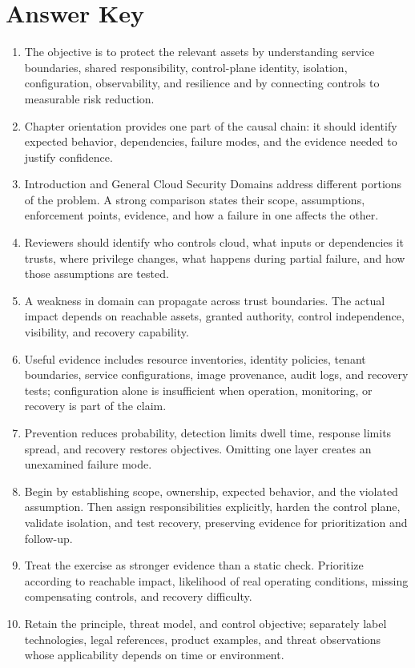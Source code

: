 \documentclass[11pt,letterpaper]{article}
\begin{document}
\section*{Answer Key}
\begin{enumerate}
\item The objective is to protect the relevant assets by understanding service boundaries, shared responsibility, control-plane identity, isolation, configuration, observability, and resilience and by connecting controls to measurable risk reduction.
\item Chapter orientation provides one part of the causal chain: it should identify expected behavior, dependencies, failure modes, and the evidence needed to justify confidence.
\item Introduction and General Cloud Security Domains address different portions of the problem. A strong comparison states their scope, assumptions, enforcement points, evidence, and how a failure in one affects the other.
\item Reviewers should identify who controls cloud, what inputs or dependencies it trusts, where privilege changes, what happens during partial failure, and how those assumptions are tested.
\item A weakness in domain can propagate across trust boundaries. The actual impact depends on reachable assets, granted authority, control independence, visibility, and recovery capability.
\item Useful evidence includes resource inventories, identity policies, tenant boundaries, service configurations, image provenance, audit logs, and recovery tests; configuration alone is insufficient when operation, monitoring, or recovery is part of the claim.
\item Prevention reduces probability, detection limits dwell time, response limits spread, and recovery restores objectives. Omitting one layer creates an unexamined failure mode.
\item Begin by establishing scope, ownership, expected behavior, and the violated assumption. Then assign responsibilities explicitly, harden the control plane, validate isolation, and test recovery, preserving evidence for prioritization and follow-up.
\item Treat the exercise as stronger evidence than a static check. Prioritize according to reachable impact, likelihood of real operating conditions, missing compensating controls, and recovery difficulty.
\item Retain the principle, threat model, and control objective; separately label technologies, legal references, product examples, and threat observations whose applicability depends on time or environment.
\end{enumerate}
\end{document}
